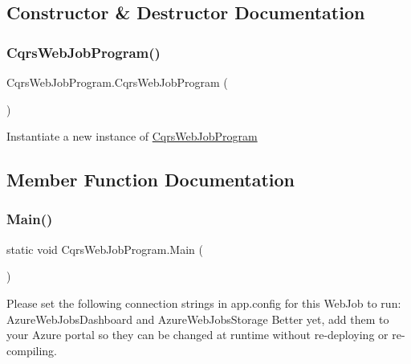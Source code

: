 \subsection{Constructor \& Destructor Documentation}
\mbox{\label{classCqrsWebJobProgram_aef553539b5ec25d0cdb061fd9895c851_aef553539b5ec25d0cdb061fd9895c851}} 
\subsubsection{\texorpdfstring{Cqrs\+Web\+Job\+Program()}{CqrsWebJobProgram()}}
{\footnotesize\ttfamily Cqrs\+Web\+Job\+Program.\+Cqrs\+Web\+Job\+Program (\begin{DoxyParamCaption}{ }\end{DoxyParamCaption})}



Instantiate a new instance of \hyperlink{classCqrsWebJobProgram}{Cqrs\+Web\+Job\+Program} 



\subsection{Member Function Documentation}
\mbox{\label{classCqrsWebJobProgram_ab11d66be0194de537cb7ae73e74c2181_ab11d66be0194de537cb7ae73e74c2181}} 
\subsubsection{\texorpdfstring{Main()}{Main()}}
{\footnotesize\ttfamily static void Cqrs\+Web\+Job\+Program.\+Main (\begin{DoxyParamCaption}{ }\end{DoxyParamCaption})\hspace{0.3cm}{\ttfamily [static]}}

Please set the following connection strings in app.\+config for this Web\+Job to run\+: Azure\+Web\+Jobs\+Dashboard and Azure\+Web\+Jobs\+Storage Better yet, add them to your Azure portal so they can be changed at runtime without re-\/deploying or re-\/compiling. 